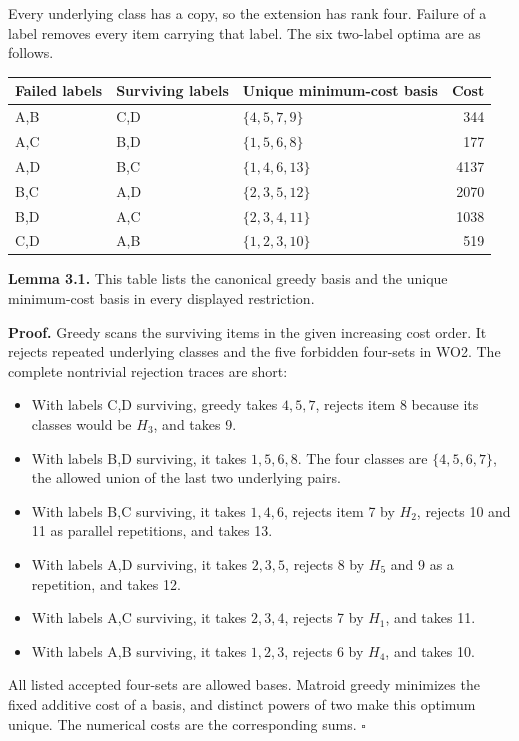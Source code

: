 Every underlying class has a copy, so the extension has rank four. Failure of a label removes every item carrying that label. The six two-label optima are as follows.

\begin{longtable}[]{@{}lllr@{}}
\toprule\noalign{}
Failed labels & Surviving labels & Unique minimum-cost basis & Cost \\
\midrule\noalign{}
\endhead
\bottomrule\noalign{}
\endlastfoot
A,B & C,D & \(\{4,5,7,9\}\) & 344 \\
A,C & B,D & \(\{1,5,6,8\}\) & 177 \\
A,D & B,C & \(\{1,4,6,13\}\) & 4137 \\
B,C & A,D & \(\{2,3,5,12\}\) & 2070 \\
B,D & A,C & \(\{2,3,4,11\}\) & 1038 \\
C,D & A,B & \(\{1,2,3,10\}\) & 519 \\
\end{longtable}

\textbf{Lemma 3.1.} This table lists the canonical greedy basis and the unique minimum-cost basis in every displayed restriction.

\textbf{Proof.} Greedy scans the surviving items in the given increasing cost order. It rejects repeated underlying classes and the five forbidden four-sets in WO2. The complete nontrivial rejection traces are short:

\begin{itemize}
\tightlist
\item
  With labels C,D surviving, greedy takes \(4,5,7\), rejects item 8 because its classes would be \(H_3\), and takes 9.
\item
  With labels B,D surviving, it takes \(1,5,6,8\). The four classes are \(\{4,5,6,7\}\), the allowed union of the last two underlying pairs.
\item
  With labels B,C surviving, it takes \(1,4,6\), rejects item 7 by \(H_2\), rejects 10 and 11 as parallel repetitions, and takes 13.
\item
  With labels A,D surviving, it takes \(2,3,5\), rejects 8 by \(H_5\) and 9 as a repetition, and takes 12.
\item
  With labels A,C surviving, it takes \(2,3,4\), rejects 7 by \(H_1\), and takes 11.
\item
  With labels A,B surviving, it takes \(1,2,3\), rejects 6 by \(H_4\), and takes 10.
\end{itemize}

All listed accepted four-sets are allowed bases. Matroid greedy minimizes the fixed additive cost of a basis, and distinct powers of two make this optimum unique. The numerical costs are the corresponding sums. \(\square\)

